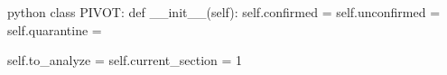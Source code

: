 \begin{mintedbox}{python}
class PIVOT:
    def __init__(self):
        self.confirmed = {}
        self.unconfirmed = {}
        self.quarantine = {}

        self.to_analyze = {}
        self.current_section = 1
\end{mintedbox}